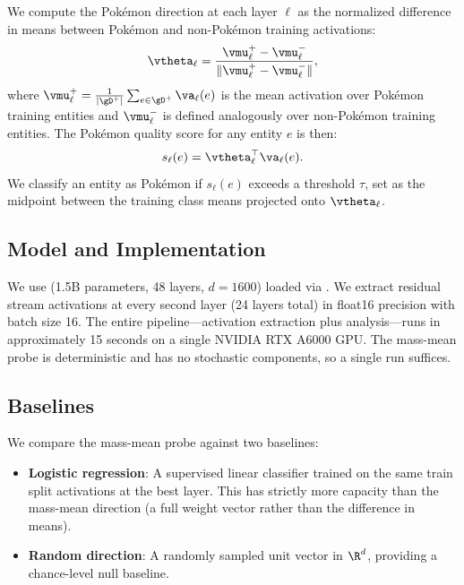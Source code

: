 We compute the Pok\'{e}mon direction at each layer $\ell$ as the normalized difference in means between Pok\'{e}mon and non-Pok\'{e}mon training activations:
\begin{equation}
\label{eq:direction}
\vtheta_\ell = \frac{\vmu_\ell^{+} - \vmu_\ell^{-}}{\|\vmu_\ell^{+} - \vmu_\ell^{-}\|},
\end{equation}
where $\vmu_\ell^{+} = \frac{1}{|\gD^{+}|}\sum_{e \in \gD^{+}} \va_\ell(e)$ is the mean activation over Pok\'{e}mon training entities and $\vmu_\ell^{-}$ is defined analogously over non-Pok\'{e}mon training entities. The Pok\'{e}mon quality score for any entity $e$ is then:
\begin{equation}
\label{eq:score}
s_\ell(e) = \vtheta_\ell^\top \va_\ell(e).
\end{equation}
We classify an entity as Pok\'{e}mon if $s_\ell(e)$ exceeds a threshold $\tau$, set as the midpoint between the training class means projected onto $\vtheta_\ell$.

\subsection{Model and Implementation}
\label{sec:implementation}

We use \gptxl (1.5B parameters, 48 layers, $d = 1600$) loaded via \tlens \citep{nanda2022transformerlens}. We extract residual stream activations at every second layer (24 layers total) in float16 precision with batch size 16. The entire pipeline---activation extraction plus analysis---runs in approximately 15 seconds on a single NVIDIA RTX A6000 GPU. The mass-mean probe is deterministic and has no stochastic components, so a single run suffices.

\subsection{Baselines}
\label{sec:baselines}

We compare the mass-mean probe against two baselines:
\begin{itemize}[leftmargin=*,itemsep=0pt,topsep=0pt]
    \item \textbf{Logistic regression}: A supervised linear classifier trained on the same train split activations at the best layer. This has strictly more capacity than the mass-mean direction (a full weight vector rather than the difference in means).
    \item \textbf{Random direction}: A randomly sampled unit vector in $\R^d$, providing a chance-level null baseline.
\end{itemize}

